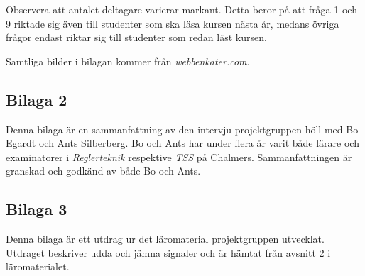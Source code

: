 \documentclass[]{article}
\begin{document}
Observera att antalet deltagare varierar markant. Detta beror på att
 fråga 1 och 9 riktade sig även till studenter som ska läsa kursen nästa
år, medans övriga frågor endast riktar sig till studenter som redan läst
kursen.



Samtliga bilder i bilagan kommer från
\textit{webbenkater.com}.
\newpage

\subsection{Bilaga 2}
\label{bil:exam_intervju}
Denna bilaga är en sammanfattning av den intervju projektgruppen höll
med Bo Egardt och Ants Silberberg. Bo och Ants har under flera år
varit både lärare och examinatorer i \textit{Reglerteknik} respektive
\textit{TSS} på Chalmers. Sammanfattningen är granskad och godkänd av
både Bo och Ants.
\newpage

\subsection{Bilaga 3}
Denna bilaga är ett utdrag ur det läromaterial projektgruppen
utvecklat. Utdraget beskriver udda och jämna signaler och är hämtat
från avsnitt 2 i läromaterialet.
\end{document}
